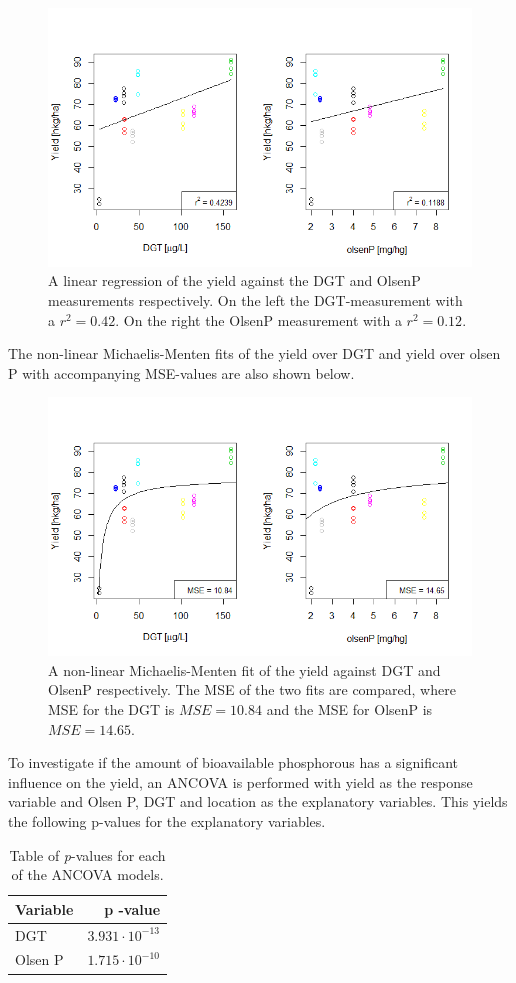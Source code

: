 \documentclass[11pt, fleqn, titlepage]{article}
\begin{document}
\begin{figure}[H]
	\centering
	\includegraphics[width=0.6\linewidth]{billeder/Linearfit.png}
	\caption{A linear regression of the yield against the DGT and OlsenP measurements respectively. On the left the DGT-measurement with a $ r^2 = 0.42 $. On the right the OlsenP measurement with a $ r^2 = 0.12 $.}
	\label{fig:linearfit}
\end{figure}

\noindent The non-linear Michaelis-Menten fits of the yield over DGT and yield over olsen P with accompanying MSE-values are also shown below.

\begin{figure}[H]
	\centering
	\includegraphics[width=0.6\linewidth]{billeder/non-linearfit.png}
	\caption{A non-linear Michaelis-Menten fit of the yield against DGT and OlsenP respectively. The MSE of the two fits are compared, where MSE for the DGT is $ MSE = 10.84 $ and the MSE for OlsenP is $ MSE = 14.65 $.}
	\label{fig:non-linearfit}
\end{figure}

\noindent To investigate if the amount of bioavailable phosphorous has a significant influence on the yield, an ANCOVA is performed with yield as the response variable and Olsen P, DGT and location as the explanatory variables. This yields the following p-values for the explanatory variables.

\begin{table}[H]
	\centering
	\begin{tabular}{l r}
		\toprule
		Variable     & p -value                       \\ \midrule
		DGT          & $3.931 \cdot 10^{-13}$         \\ 
		Olsen P      & $1.715 \cdot 10^{-10}$         \\ \bottomrule 
	\end{tabular}
	\caption{Table of \textit{p}-values for each of the ANCOVA models.}
	\label{tabel}
\end{table}
\end{document}
